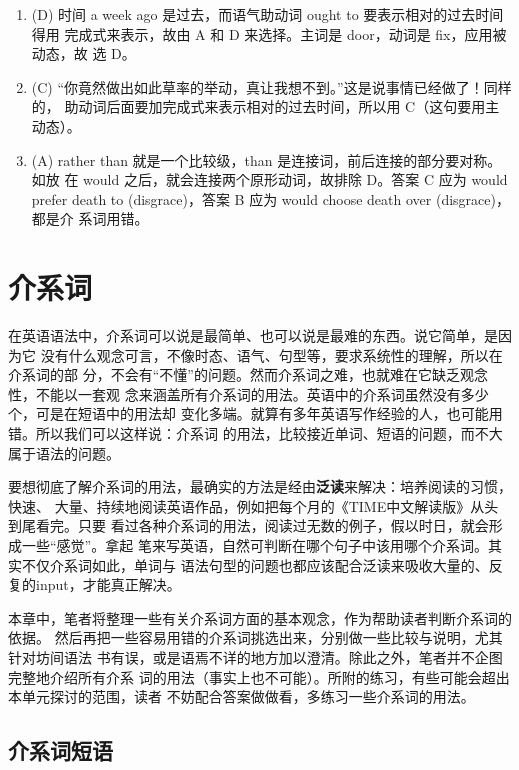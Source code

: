 \documentclass{yufa}
\begin{document}
\begin{enumerate}
\item (D) 时间 a week ago 是过去，而语气助动词 ought to 要表示相对的过去时间得用
  完成式来表示，故由 A 和 D 来选择。主词是 door，动词是 fix，应用被动态，故
  选 D。

\item (C) “你竟然做出如此草率的举动，真让我想不到。”这是说事情已经做了！同样的，
  助动词后面要加完成式来表示相对的过去时间，所以用 C（这句要用主动态）。
\item (A) rather than 就是一个比较级，than 是连接词，前后连接的部分要对称。如放
  在 would 之后，就会连接两个原形动词，故排除 D。答案 C 应为 would prefer
  death to (disgrace)，答案 B 应为 would choose death over (disgrace)，都是介
  系词用错。

\end{enumerate}

\chapter{介系词}

在英语语法中，介系词可以说是最简单、也可以说是最难的东西。说它简单，是因为它
没有什么观念可言，不像时态、语气、句型等，要求系统性的理解，所以在介系词的部
分，不会有“不懂”的问题。然而介系词之难，也就难在它缺乏观念性，不能以一套观
念来涵盖所有介系词的用法。英语中的介系词虽然没有多少个，可是在短语中的用法却
变化多端。就算有多年英语写作经验的人，也可能用错。所以我们可以这样说：介系词
的用法，比较接近单词、短语的问题，而不大属于语法的问题。

要想彻底了解介系词的用法，最确实的方法是经由\textbf{泛读}来解决：培养阅读的习惯，快速、
大量、持续地阅读英语作品，例如把每个月的《TIME中文解读版》从头到尾看完。只要
看过各种介系词的用法，阅读过无数的例子，假以时日，就会形成一些“感觉”。拿起
笔来写英语，自然可判断在哪个句子中该用哪个介系词。其实不仅介系词如此，单词与
语法句型的问题也都应该配合泛读来吸收大量的、反复的input，才能真正解决。

本章中，笔者将整理一些有关介系词方面的基本观念，作为帮助读者判断介系词的依据。
然后再把一些容易用错的介系词挑选出来，分别做一些比较与说明，尤其针对坊间语法
书有误，或是语焉不详的地方加以澄清。除此之外，笔者并不企图完整地介绍所有介系
词的用法（事实上也不可能）。所附的练习，有些可能会超出本单元探讨的范围，读者
不妨配合答案做做看，多练习一些介系词的用法。

\section{介系词短语}
\end{document}
